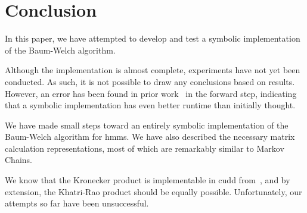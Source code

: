 % 

\section{Conclusion}\label{sec:conclusion}

In this paper, we have attempted to develop and test a symbolic implementation of the Baum-Welch algorithm.

Although the implementation is almost complete, experiments have not yet been conducted.
As such, it is not possible to draw any conclusions based on results.
However, an error has been found in prior work~\cite{p7} in the forward step, indicating that a symbolic implementation has even better runtime than initially thought.

We have made small steps toward an entirely symbolic implementation of the Baum-Welch algorithm for \glspl{hmm}.
We have also described the necessary matrix calculation representations, most of which are remarkably similar to Markov Chains.

We know that the Kronecker product is implementable in \gls{cudd} from~\cite{davidkebo-kronecker}, and by extension, the Khatri-Rao product should be equally possible.
Unfortunately, our attempts so far have been unsuccessful.
